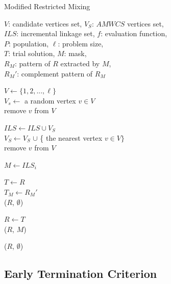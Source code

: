 \documentclass{sig-alternate-05-2015}
\begin{document}
\begin{algorithm}
\caption{Modified Restricted Mixing}\label{algo_disjdecomp}

$V$: candidate vertices set, $V_S$: $AMWCS$ vertices set,  \\
$ILS$: incremental linkage set, $f$: evaluation function, \\
$P$: population, $\ell$: problem size, \\
$T$: trial solution, $M$: mask, \\
${R_M}$: pattern of $R$ extracted by $M$, \\
${R_M}'$: complement pattern of ${R_M}$


\BlankLine
$V \leftarrow \{ 1, 2, ..., \ell \}$ \\
$V_s \leftarrow$ a random vertex $v \in V$ \\
remove $v$ from $V$ \\

 {

    $ILS \leftarrow ILS \cup V_{S}$ \\
    $V_S \leftarrow V_S$ $\cup$ \{ the nearest vertex $v \in V \}$ \\
    remove $v$ from $V$ \\
}

\BlankLine
{} {

    $M \leftarrow ILS_i$ \\

     {

        $T \leftarrow R$ \\
        $T_M \leftarrow {R_M}'$ \\

         {
            \Return ($R$, $\emptyset$) 
        }

         {
            $R \leftarrow T$ \\
            \Return ($R$, $M$)
        }
    }
}
\Return ($R$, $\emptyset$) 
\end{algorithm}


\subsection{Early Termination Criterion}
\end{document}
